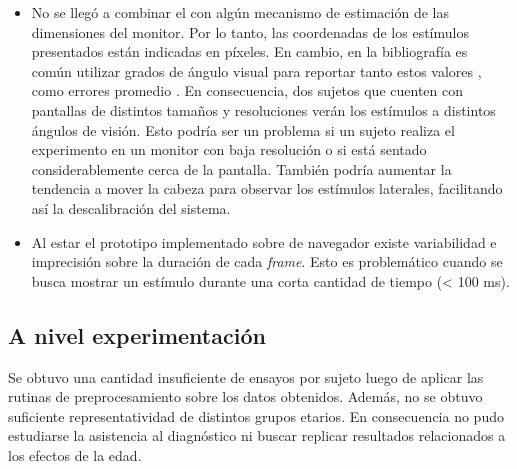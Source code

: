 \begin{itemize}
    \item
      No se llegó a combinar el \eyetracking con algún mecanismo de estimación
      de las dimensiones del monitor.
      Por lo tanto, las coordenadas de los estímulos presentados están
      indicadas en píxeles.
      En cambio, en la bibliografía es común utilizar grados de ángulo visual
      para reportar tanto estos valores \cite{munoz_2004_look_away,
      olincy_1997_age_diminishes_performance, smyrnis_2002_big_sample}, como
      errores promedio \cite{huang_2016_pace, santini_2017_eyerectoo}.
      En consecuencia, dos sujetos que cuenten con pantallas de distintos
      tamaños y resoluciones verán los estímulos a distintos ángulos de visión.
      Esto podría ser un problema si un sujeto realiza el experimento en un
      monitor con baja resolución o si está sentado considerablemente cerca de
      la pantalla.
      También podría aumentar la tendencia a mover la cabeza para observar los
      estímulos laterales, facilitando así la descalibración del sistema.
  
    \item
      Al estar el prototipo implementado sobre \js de navegador existe
      variabilidad e imprecisión sobre la duración de cada \textit{frame}.
      Esto es problemático cuando se busca mostrar un estímulo durante una
      corta cantidad de tiempo (< 100 ms).
  
  \end{itemize}

\subsection{A nivel experimentación}

  Se obtuvo una cantidad insuficiente de ensayos por sujeto luego de aplicar
  las rutinas de preprocesamiento sobre los datos obtenidos.
  Además, no se obtuvo suficiente representatividad de distintos grupos
  etarios.
  En consecuencia no pudo estudiarse la asistencia al diagnóstico ni
  buscar replicar resultados relacionados a los efectos de la edad.


